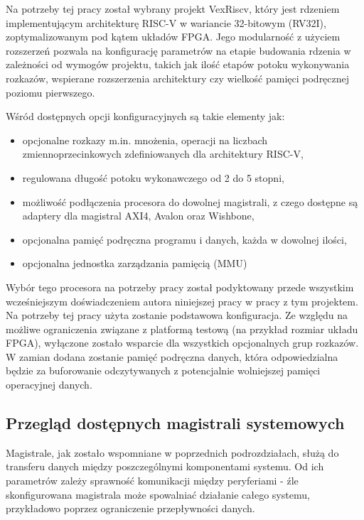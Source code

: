 Na potrzeby tej pracy został wybrany projekt VexRiscv\cite{vexriscv:2018:Online}, który jest rdzeniem implementującym architekturę RISC-V\cite{Waterman:EECS-2014-54} w wariancie 32-bitowym (RV32I), zoptymalizowanym pod kątem układów FPGA. Jego modularność z użyciem rozszerzeń pozwala na konfigurację parametrów na etapie budowania rdzenia w zależności od wymogów projektu, takich jak ilość etapów potoku wykonywania rozkazów, wspierane rozszerzenia architektury czy wielkość pamięci podręcznej poziomu pierwszego.

Wśród dostępnych opcji konfiguracyjnych są takie elementy jak:
\begin{itemize}
	\item opcjonalne rozkazy m.in. mnożenia, operacji na liczbach zmiennoprzecinkowych zdefiniowanych dla architektury RISC-V,
	\item regulowana długość potoku wykonawczego od 2 do 5 stopni,
	\item możliwość podłączenia procesora do dowolnej magistrali, z czego dostępne są adaptery dla magistral AXI4, Avalon oraz Wishbone,
	\item opcjonalna pamięć podręczna programu i danych, każda w dowolnej ilości,
	\item opcjonalna jednostka zarządzania pamięcią (MMU)
\end{itemize}

Wybór tego procesora na potrzeby pracy został podyktowany przede wszystkim wcześniejszym doświadczeniem autora niniejszej pracy w pracy z tym projektem. Na potrzeby tej pracy użyta zostanie podstawowa konfiguracja. Ze względu na możliwe ograniczenia związane z platformą testową (na przykład rozmiar układu FPGA), wyłączone zostało wsparcie dla wszystkich opcjonalnych grup rozkazów. W zamian dodana zostanie pamięć podręczna danych, która odpowiedzialna będzie za buforowanie odczytywanych z potencjalnie wolniejszej pamięci operacyjnej danych.

\subsection{Przegląd dostępnych magistrali systemowych}

Magistrale, jak zostało wspomniane w poprzednich podrozdziałach, służą do transferu danych między poszczególnymi komponentami systemu. Od ich parametrów zależy sprawność komunikacji między peryferiami - źle skonfigurowana magistrala może spowalniać działanie całego systemu, przykładowo poprzez ograniczenie przepływności danych.

